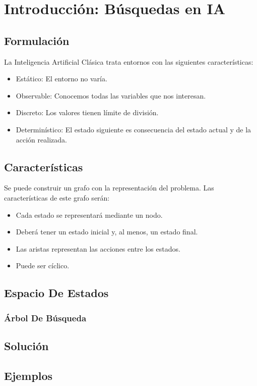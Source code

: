 \chapter{Introducción: Búsquedas en IA}

\section{Formulación}
La Inteligencia Artificial Clásica trata entornos con las siguientes características:
\begin{itemize}
    \item Estático: El entorno no varía.
    \item Observable: Conocemos todas las variables que nos interesan.
    \item Discreto: Los valores tienen límite de división.
    \item Determinístico: El estado siguiente es consecuencia del estado actual y de la acción realizada.
\end{itemize}

\section{Características}
Se puede construir un grafo con la representación del problema. Las características de este grafo serán:
\begin{itemize}
    \item Cada estado se representará mediante un nodo.
    \item Deberá tener un estado inicial y, al menos, un estado final.
    \item Las aristas representan las acciones entre los estados.
    \item Puede ser cíclico.
\end{itemize}

\section{Espacio De Estados}
\subsection{Árbol De Búsqueda}

\section{Solución}

\section{Ejemplos}


